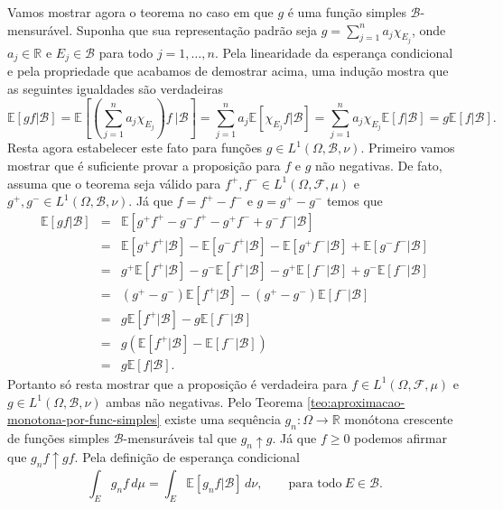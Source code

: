 Vamos mostrar agora o teorema no caso em que $g$ é uma função simples $\mathcal{B}$-mensurável. Suponha que sua representação padrão seja 
$g = \sum_{j=1}^n a_j \chi_{E_j}$, onde $a_j\in\mathbb{R}$ e $E_j\in \mathcal{B}$ para todo $j=1,\ldots,n$.
Pela linearidade da esperança condicional e pela propriedade que acabamos de demostrar acima, uma indução mostra que as seguintes igualdades 
são verdadeiras
$$
\mathbb{E}[gf|\mathcal{B}]=\mathbb{E}\left[\left(\sum_{j=1}^n a_j \chi_{E_j}\right)f\ \Big|\mathcal{B}\right]
=\sum_{j=1}^n a_j \mathbb{E}[\chi_{E_j}f|\mathcal{B}]
=\sum_{j=1}^n a_j\chi_{E_j} \mathbb{E}[f|\mathcal{B}]
=g\mathbb{E}[f|\mathcal{B}].
$$
Resta agora estabelecer este fato para funções $g\in L^1(\Omega,\mathcal{B},\nu)$. Primeiro vamos mostrar que 
é suficiente provar a proposição para $f$ e $g$ não negativas. De fato, assuma que o teorema seja válido para 
$f^+,f^-\in L^1(\Omega,\mathcal{F},\mu)$ e $g^+,g^-\in L^1(\Omega,\mathcal{B},\nu)$. Já que $f=f^+-f^-$ e $g=g^+-g^-$
temos que 
\begin{eqnarray*}
	\mathbb{E}[gf|\mathcal{B}]&=&\mathbb{E}[g^+f^+-g^-f^+-g^+f^-+g^-f^-|\mathcal{B}]\\[0.2cm]
	&=& \mathbb{E}[g^+f^+|\mathcal{B}]- \mathbb{E}[g^-f^+|\mathcal{B}] -\mathbb{E}[g^+f^-|\mathcal{B}]+\mathbb{E}[g^-f^-|\mathcal{B}]\\[0.2cm]
	&=& g^+\mathbb{E}[f^+|\mathcal{B}]-g^-\mathbb{E}[f^+|\mathcal{B}]-g^+\mathbb{E}[f^-|\mathcal{B}]+g^-\mathbb{E}[f^-|\mathcal{B}]\\[0.2cm]
	&=&(g^+-g^-)\mathbb{E}[f^+|\mathcal{B}]-(g^+-g^-)\mathbb{E}[f^-|\mathcal{B}]\\[0.2cm]
	&=&g\mathbb{E}[f^+|\mathcal{B}]-g\mathbb{E}[f^-|\mathcal{B}]\\[0.2cm]
	&=&g(\mathbb{E}[f^+|\mathcal{B}]-\mathbb{E}[f^-|\mathcal{B}])\\[0.2cm]
	&=&g\mathbb{E}[f|\mathcal{B}].
\end{eqnarray*}
Portanto só resta mostrar que a proposição é verdadeira para $f\in L^1(\Omega,\mathcal{F},\mu)$ e $g\in L^1(\Omega,\mathcal{B},\nu)$ ambas não negativas. 
Pelo Teorema \ref{teo:aproximacao-monotona-por-func-simples} existe uma sequência $g_n:\Omega\to\mathbb{R}$ monótona crescente de funções simples $\mathcal{B}$-mensuráveis 
tal que $g_n\uparrow g$. Já que $f\geq 0$ podemos afirmar que $g_nf\uparrow gf$. Pela definição de esperança condicional 
\begin{equation}\label{eq:aux3-esp-cond}
\int_{E}g_nf\, d\mu = \int_{E} \mathbb{E}[g_nf|\mathcal{B}]\, d\nu,\qquad\text{para todo}\ E\in\mathcal{B}.
\end{equation}
